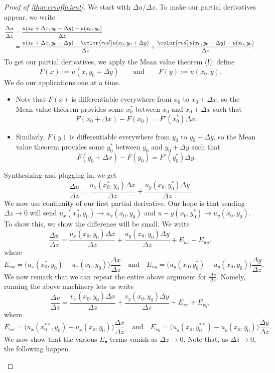 \begin{proof}[Proof of \autoref{thm:crsufficient}]
	We start with $\Delta u/\Delta z$. To make our partial derivatives appear, we write
	\begin{align*}
		\frac{\Delta u}{\Delta z} &= \frac{u(x_0+\Delta x,y_0+\Delta y)-u(x_0,y_0)}{\Delta z} \\
		&= \frac{u(x_0+\Delta x,y_0+\Delta y)-{\color{red}u(x_0,y_0+\Delta y)}}{\Delta z}+\frac{{\color{red}u(x_0,y_0+\Delta y)}-u(x_0,y_0)}{\Delta z}.
	\end{align*}
	To get our partial derivatives, we apply the Mean value theorem (!): define
	\[F(x):=u(x,y_0+\Delta y)\qquad\text{and}\qquad F(y):=u(x_0,y).\]
	We do our applications one at a time.
	\begin{itemize}
		\item Note that $F(x)$ is differentiable everywhere from $x_0$ to $x_0+\Delta x$, so the Mean value theorem provides some $x_0^*$ between $x_0$ and $x_0+\Delta x$ such that
		\[F(x_0+\Delta x)-F(x_0)=F'(x_0^*)\Delta x.\]
		\item Similarly, $F(y)$ is differentiable everywhere from $y_0$ to $y_0+\Delta y$, so the Mean value theorem provides some $y_0^*$ between $y_0$ and $y_0+\Delta y$ such that
		\[F(y_0+\Delta x)-F(y_0)=F'(y_0^*)\Delta y.\]
	\end{itemize}
	Synthesizing and plugging in, we get
	\[\frac{\Delta u}{\Delta z}=\frac{u_x(x_0^*,y_0)\Delta x}{\Delta z}+\frac{u_y(x_0,y_0^*)\Delta y}{\Delta z}.\]
	We now use continuity of our first partial derivative. Our hope is that sending $\Delta z\to0$ will send $u_x(x_0^*,y_0)\to u_x(x_0,y_0)$ and $u-y(x_0,y_0^*)\to u_y(x_0,y_0)$. To show this, we show the difference will be small. We write
	\[\frac{\Delta u}{\Delta z}=\frac{u_x(x_0,y_0)\Delta x}{\Delta z}+\frac{u_y(x_0,y_0)\Delta y}{\Delta z}+E_{ux}+E_{uy},\]
	where
	\[E_{ux}=\big(u_x(x_0^*,y_0)-u_x(x_0,y_0)\big)\frac{\Delta x}{\Delta z}\quad\text{and}\quad E_{uy}=\big(u_y(x_0,y_0^*)-u_y(x_0,y_0)\big)\frac{\Delta y}{\Delta z}.\]
	We now remark that we can repeat the entire above argument for $\frac{\Delta v}{\Delta z}$. Namely, running the above machinery lets us write
	\[\frac{\Delta v}{\Delta z}=\frac{v_x(x_0,y_0)\Delta x}{\Delta z}+\frac{v_y(x_0,y_0)\Delta y}{\Delta z}+E_{vx}+E_{vy},\]
	where
	\[E_{vx}=\big(u_x(x_0^{**},y_0)-u_x(x_0,y_0)\big)\frac{\Delta x}{\Delta z}\quad\text{and}\quad E_{vy}=\big(u_y(x_0,y_0^{**})-u_y(x_0,y_0)\big)\frac{\Delta y}{\Delta z}.\]
	We now show that the various $E_\bullet$ terms vanish as $\Delta z\to0$. Note that, as $\Delta z\to0$, the following happen.
	\begin{itemize}

\end{itemize}
\end{proof}
